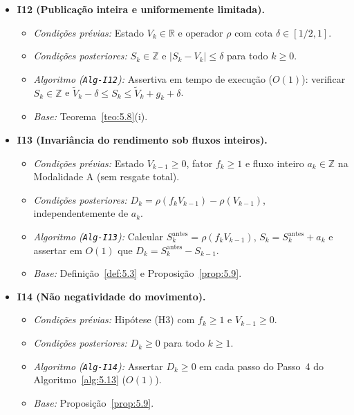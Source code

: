 \documentclass[11pt, a4paper]{article}
\theoremstyle{definition}
\theoremstyle{plain}
\theoremstyle{remark}
\begin{document}
\begin{itemize}
    \item \textbf{I12 (Publicação inteira e uniformemente limitada).}
    \begin{itemize}
        \item \emph{Condições prévias:} Estado $V_k \in \mathbb{R}$ e operador $\rho$ com cota $\delta \in [1/2, 1]$.
        \item \emph{Condições posteriores:} $S_k \in \mathbb{Z}$ e $|S_k - V_k| \le \delta$ para todo $k \ge 0$.
        \item \emph{Algoritmo (\texttt{Alg-I12}):} Assertiva em tempo de execução ($O(1)$): verificar $S_k \in \mathbb{Z}$ e $\tilde{V}_k - \delta \le S_k \le \tilde{V}_k + g_k + \delta$.
        \item \emph{Base:} Teorema~\ref{teo:5.8}(i).
    \end{itemize}

    \item \textbf{I13 (Invariância do rendimento sob fluxos inteiros).}
    \begin{itemize}
        \item \emph{Condições prévias:} Estado $V_{k-1} \ge 0$, fator $f_k \ge 1$ e fluxo inteiro $a_k \in \mathbb{Z}$ na Modalidade A (sem resgate total).
        \item \emph{Condições posteriores:} $D_k = \rho(f_k V_{k-1}) - \rho(V_{k-1})$, independentemente de $a_k$.
        \item \emph{Algoritmo (\texttt{Alg-I13}):} Calcular $S_k^{\text{antes}} = \rho(f_k V_{k-1})$, $S_k = S_k^{\text{antes}} + a_k$ e assertar em $O(1)$ que $D_k = S_k^{\text{antes}} - S_{k-1}$.
        \item \emph{Base:} Definição~\ref{def:5.3} e Proposição~\ref{prop:5.9}.
    \end{itemize}

    \item \textbf{I14 (Não negatividade do movimento).}
    \begin{itemize}
        \item \emph{Condições prévias:} Hipótese (H3) com $f_k \ge 1$ e $V_{k-1} \ge 0$.
        \item \emph{Condições posteriores:} $D_k \ge 0$ para todo $k \ge 1$.
        \item \emph{Algoritmo (\texttt{Alg-I14}):} Assertar $D_k \ge 0$ em cada passo do Passo~4 do Algoritmo~\ref{alg:5.13} ($O(1)$).
        \item \emph{Base:} Proposição~\ref{prop:5.9}.
    \end{itemize}


\end{itemize}
\end{document}
